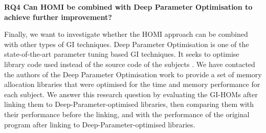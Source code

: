 \documentclass[oribibl]{llncs}
\begin{document}
\vspace{2mm}
\noindent\textbf{RQ4 Can HOMI be combined with Deep Parameter Optimisation to achieve further improvement?}
\vspace{2mm}

Finally, we want to investigate whether the HOMI approach can be combined with other types of GI techniques. Deep Parameter Optimisation is one of the state-of-the-art parameter tuning based GI techniques. It seeks to optimise library code used instead of the source code of the subjects \cite{Wu:2015:DPO:2739480.2754648}. We have contacted the authors of the Deep Parameter Optimisation work to provide a set of memory allocation libraries that were optimised for the time and memory performance for each subject. We answer this research question by evaluating the GI-HOMs after linking them to Deep-Parameter-optimised libraries, then comparing them with their performance before the linking, and with the performance of the original program after linking to Deep-Parameter-optimised libraries.
\end{document}
